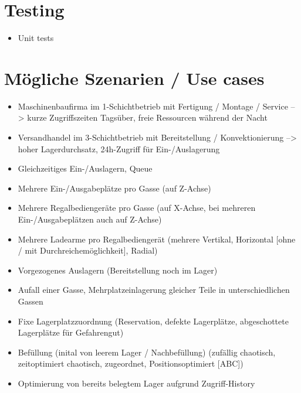 \documentclass[11pt,a4paper]{article}
\begin{document}
\section{Testing}
\begin{itemize}
  \item Unit tests
\end{itemize}
%
\section{Mögliche Szenarien / Use cases}
\begin{itemize}
  \item Maschinenbaufirma im 1-Schichtbetrieb mit Fertigung / Montage / Service --> kurze Zugriffszeiten Tagsüber, freie Ressourcen während der Nacht
  \item Versandhandel im 3-Schichtbetrieb mit Bereitstellung / Konvektionierung --> hoher Lagerdurchsatz, 24h-Zugriff für Ein-/Auslagerung
  \item Gleichzeitiges Ein-/Auslagern, Queue
  \item Mehrere Ein-/Ausgabeplätze pro Gasse (auf Z-Achse)
  \item Mehrere Regalbediengeräte pro Gasse (auf X-Achse, bei mehreren Ein-/Ausgabeplätzen auch auf Z-Achse)
  \item Mehrere Ladearme pro Regalbediengerät (mehrere Vertikal, Horizontal [ohne / mit Durchreichemöglichkeit], Radial)
  \item Vorgezogenes Auslagern (Bereitstellung noch im Lager)
  \item Aufall einer Gasse, Mehrplatzeinlagerung gleicher Teile in unterschiedlichen Gassen
  \item Fixe Lagerplatzzuordnung (Reservation, defekte Lagerplätze, abgeschottete Lagerplätze für Gefahrengut)
  \item Befüllung (inital von leerem Lager / Nachbefüllung) (zufällig chaotisch, zeitoptimiert chaotisch, zugeordnet, Positionsoptimiert [ABC])
  \item Optimierung von bereits belegtem Lager aufgrund Zugriff-History
\end{itemize}


\end{document}

